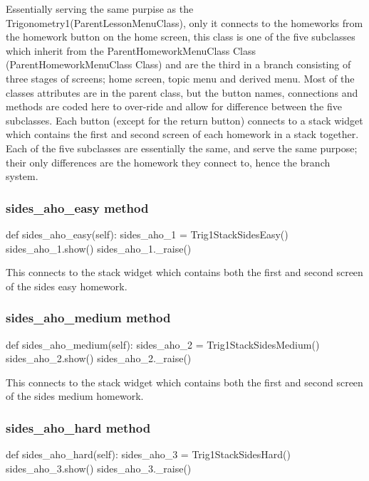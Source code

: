 Essentially serving the same purpise as the Trigonometry1(ParentLessonMenuClass), only it connects to the homeworks from the homework button on the home screen, this class is one of the five subclasses which inherit from the ParentHomeworkMenuClass Class (ParentHomeworkMenuClass Class) and are the third in a branch consisting of three stages of screens; home screen, topic menu and derived menu. Most of the classes attributes are in the parent class, but the button names, connections and methods are coded here to over-ride and allow for difference between the five subclasses. Each button (except for the return button) connects to a stack widget which contains the first and second screen of each homework in a stack together. Each of the five subclasses are essentially the same, and serve the same purpose; their only differences are the homework they connect to, hence the branch system.

\subsubsection{sides\_aho\_easy method}

\begin{python}
def sides_aho_easy(self):
        sides_aho_1 = Trig1StackSidesEasy()
        sides_aho_1.show()
        sides_aho_1._raise()
\end{python}

This connects to the stack widget which contains both the first and second screen of the sides easy homework.

\subsubsection{sides\_aho\_medium method}

\begin{python}
def sides_aho_medium(self):
        sides_aho_2 = Trig1StackSidesMedium()
        sides_aho_2.show()
        sides_aho_2._raise()
\end{python}

This connects to the stack widget which contains both the first and second screen of the sides medium homework.

\subsubsection{sides\_aho\_hard method}

\begin{python}
def sides_aho_hard(self):
        sides_aho_3 = Trig1StackSidesHard()
        sides_aho_3.show()
        sides_aho_3._raise()
\end{python}

